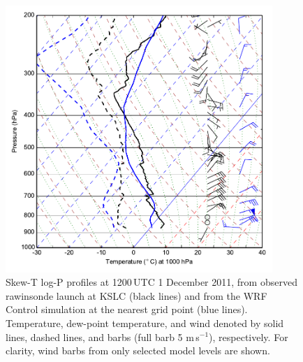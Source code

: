 \documentclass[pdftex,12pt]{article}
\def\mps{m\,s$^{-1}$}
\begin{document}
\begin{figure}[t]
\centering
\includegraphics[width=0.9\textwidth]{KSLC_SkewT.pdf}
\caption{Skew-T log-P profiles at 1200\,UTC 1 December 2011, from observed rawinsonde launch at KSLC (black lines) and from the WRF Control simulation at the nearest grid point (blue lines). Temperature, dew-point temperature, and wind denoted by solid lines, dashed lines, and barbs (full barb 5 \mps), respectively. For clarity, wind barbs from only selected model levels are shown.}
\label{fig:kslcWRF}
\end{figure}
\end{document}
